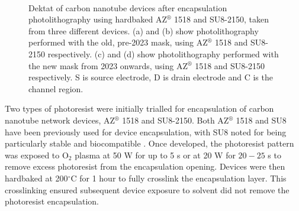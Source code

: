 \documentclass[
  a4paper,
]{scrbook}
\begin{document}
\begin{figure}
\begin{minipage}[t]{0.45\linewidth}
{{}

}

\end{minipage}%
%
\begin{minipage}[t]{0.01\linewidth}

{\centering 

~

}

\end{minipage}%

\caption[Dektat of carbon nanotube devices after encapsulation
photolithography using hardbaked AZ 1518 and SU8-2150, taken from three
different devices.]{\label{fig-dektat-encapsulation}Dektat of carbon
nanotube devices after encapsulation photolithography using hardbaked
AZ\(^\circledR\) 1518 and SU8-2150, taken from three different devices.
(a) and (b) show photolithography performed with the old, pre-2023 mask,
using AZ\(^\circledR\) 1518 and SU8-2150 respectively. (c) and (d) show
photolithography performed with the new mask from 2023 onwards, using
AZ\(^\circledR\) 1518 and SU8-2150 respectively. S is source electrode,
D is drain electrode and C is the channel region.}

\end{figure}

Two types of photoresist were initially trialled for encapsulation of
carbon nanotube network devices, AZ\(^\circledR\) 1518 and SU8-2150.
Both AZ\(^\circledR\) 1518
\autocite{Murugathas2018,Murugathas2019a,Shkodra2021} and SU8 have been
previously used for device encapsulation, with SU8 noted for being
particularly stable and biocompatible
\autocite{Lee2006,Chen2021,Albarghouthi2022}. Once developed, the
photoresist pattern was exposed to O\(_2\) plasma at 50 W for up to 5 s
or at 20 W for \(20-25\) s to remove excess photoresist from the
encapsulation opening. Devices were then hardbaked at 200\(^\circ\)C for
1 hour to fully crosslink the encapsulation layer. This crosslinking
ensured subsequent device exposure to solvent did not remove the
photoresist encapsulation.
\end{document}
